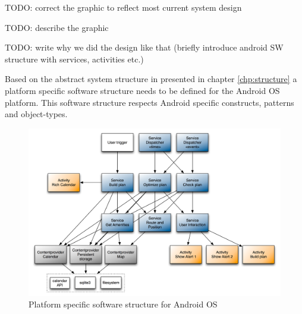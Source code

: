 TODO: correct the graphic to reflect most current system design

TODO: describe the graphic

TODO: write why we did the design like that (briefly introduce android SW structure with services, activities etc.)

Based on the abstract system structure in presented in chapter \ref{chp:structure} a platform specific software structure needs to be defined for the Android OS platform. This software structure respects Android specific constructs, patterns and object-types.\\
\begin{figure}[h!]
\centering
\includegraphics[width=16cm]{pics/android_structure.png}
\caption{Platform specific software structure for Android OS}
\label{android_strucutre}
\end{figure}